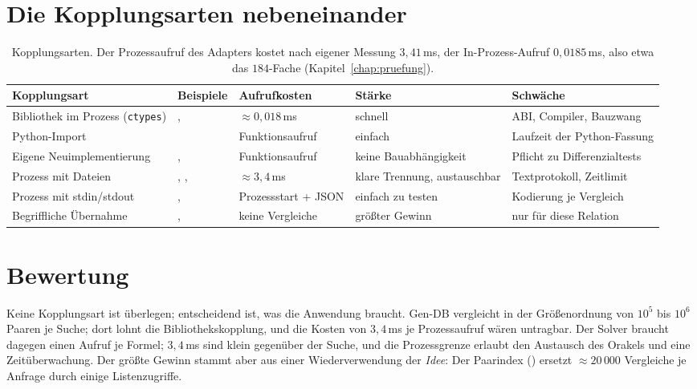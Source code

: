 \section{Die Kopplungsarten nebeneinander}

\begin{table}[!ht]
	\centering
	\small
	\begin{tabularx}{\textwidth}{@{}L{3.5cm}L{2.0cm}L{3.0cm}L{3.0cm}Y@{}}
		\toprule
		Kopplungsart & Beispiele & Aufrufkosten & Stärke & Schwäche \\
		\midrule
		Bibliothek im Prozess (\texttt{ctypes}) & ,  & $\approx 0{,}018$\,ms & schnell & ABI, Compiler, Bauzwang \\
		Python-Import &  & Funktionsaufruf & einfach & Laufzeit der Python-Fassung \\
		Eigene Neuimplementierung & ,  & Funktionsaufruf & keine Bauabhängigkeit & Pflicht zu Differenzialtests \\
		Prozess mit Dateien & , ,  & $\approx 3{,}4$\,ms & klare Trennung, austauschbar & Textprotokoll, Zeitlimit \\
		Prozess mit stdin/stdout & ,  & Prozessstart + JSON & einfach zu testen & Kodierung je Vergleich \\
		Begriffliche Übernahme & ,  & keine Vergleiche & größter Gewinn & nur für diese Relation \\
		\bottomrule
	\end{tabularx}
	\caption{Kopplungsarten. Der Prozessaufruf des Adapters kostet nach eigener Messung $3{,}41$\,ms, der In-Prozess-Aufruf $0{,}0185$\,ms, also etwa das $184$-Fache (Kapitel~\ref{chap:pruefung}).}
	\label{tab:kopplungen}
\end{table}

\section{Bewertung}

Keine Kopplungsart ist überlegen; entscheidend ist, was die Anwendung braucht. Gen-DB vergleicht in der Größenordnung von $10^5$ bis $10^6$ Paaren je Suche; dort lohnt die Bibliothekskopplung, und die Kosten von $3{,}4$\,ms je Prozessaufruf wären untragbar. Der Solver braucht dagegen einen Aufruf je Formel; $3{,}4$\,ms sind klein gegenüber der Suche, und die Prozessgrenze erlaubt den Austausch des Orakels und eine Zeitüberwachung. Der größte Gewinn stammt aber aus einer Wiederverwendung der \emph{Idee}: Der Paarindex () ersetzt $\approx 20\,000$ Vergleiche je Anfrage durch einige Listenzugriffe.

